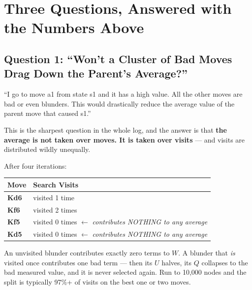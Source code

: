 \chapter{Three Questions, Answered with the Numbers Above}
\label{ch:three_questions}

\section{Question 1: ``Won't a Cluster of Bad Moves Drag Down the Parent's Average?''}

\begin{studentq}
``I go to move a1 from state s1 and it has a high value. All the other moves are bad or even blunders. This would drastically reduce the average value of the parent move that caused s1.''
\end{studentq}

This is the sharpest question in the whole log, and the answer is that \textbf{the average is not taken over moves. It is taken over visits} --- and visits are distributed wildly unequally.

After four iterations:
\begin{center}
\begin{tabular}{ll}
  \toprule
  Move & Search Visits \\
  \midrule
  \textbf{Kd6} & visited 1 time \\
  \textbf{Kf6} & visited 2 times \\
  \textbf{Kf5} & visited 0 times $\leftarrow$ \textit{contributes NOTHING to any average} \\
  \textbf{Kd5} & visited 0 times $\leftarrow$ \textit{contributes NOTHING to any average} \\
  \bottomrule
\end{tabular}
\end{center}

An unvisited blunder contributes exactly zero terms to $W$. A blunder that \textit{is} visited once contributes one bad term --- then its $U$ halves, its $Q$ collapses to the bad measured value, and it is never selected again. Run to 10,000 nodes and the split is typically 97\%+ of visits on the best one or two moves.

\begin{center}
\begin{minipage}{\linewidth}
\centering

\label{fig:visits}
\end{minipage}
\end{center}

